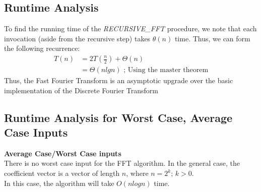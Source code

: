 \documentclass{article}
\begin{document}
\subsection{Runtime Analysis}
To find the running time of the \textit{RECURSIVE\_FFT} procedure, we note that each invocation (aside from the recursive step) takes $\theta(n)$ time. Thus, we can form the following recurrence: \\
\begin{align*}
T(n)&=2T(\frac{n}{2})+\Theta(n) \\
&=\Theta(nlgn) \text{ ; Using the master theorem}
\end{align*}
Thus, the Fast Fourier Transform is an asymptotic upgrade over the basic implementation of the Discrete Fourier Transform

\subsection{Runtime Analysis for Worst Case, Average Case Inputs}
\textbf{Average Case/Worst Case inputs} \\
There is no worst case input for the FFT algorithm. In the general case, the coefficient vector is a vector of length $n$, where $n=2^{k}$; $k>0$. \\
In this case, the algorithm will take $O(nlogn)$ time.
\end{document}
